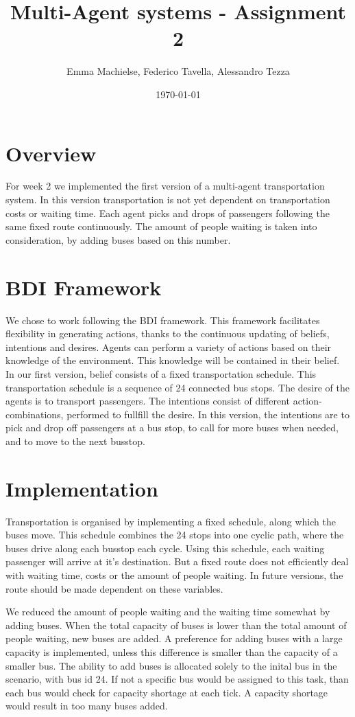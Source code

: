 \documentclass[a4paper]{article}
\title{Multi-Agent systems - Assignment 2}
\author{Emma Machielse, Federico Tavella, Alessandro Tezza}
\date{\today}
\begin{document}
\maketitle

\section{Overview}
For week 2 we implemented the first version of a multi-agent transportation system. In this version transportation is not yet dependent on transportation costs or waiting time. Each agent picks and drops of passengers following the same fixed route continuously. The amount of people waiting is taken into consideration, by adding buses based on this number. 

\section{BDI Framework}

We chose to work following the BDI framework. This framework facilitates flexibility in generating actions, thanks to the continuous updating of beliefs, intentions and desires. Agents can perform a variety of actions based on their knowledge of the environment. This knowledge will be contained in their belief. In our first version, belief consists of a fixed transportation schedule. This transportation schedule is a sequence of 24 connected bus stops. The desire of the agents is to transport passengers. The intentions consist of different action-combinations, performed to fullfill the desire. In this version, the intentions are to pick and drop off passengers at a bus stop, to call for more buses when needed, and to move to the next busstop.  

\section{Implementation}

Transportation is organised by implementing a fixed schedule, along which the buses move. This schedule combines the 24 stops into one cyclic path, where the buses drive along each busstop each cycle. Using this schedule, each waiting passenger will arrive at it's destination. But a fixed route does not efficiently deal with waiting time, costs or the amount of people waiting. In future versions, the route should be made dependent on these variables. 

We reduced the amount of people waiting and the waiting time somewhat by adding buses. When the total capacity of buses is lower than the total amount of people waiting, new buses are added. A preference for adding buses with a large capacity is implemented, unless this difference is smaller than the capacity of a smaller bus. The ability to add buses is allocated solely to the inital bus in the scenario, with bus id 24. If not a specific bus would be assigned to this task, than each bus would check for capacity shortage at each tick. A capacity shortage would result in too many buses added. 
\end{document}
